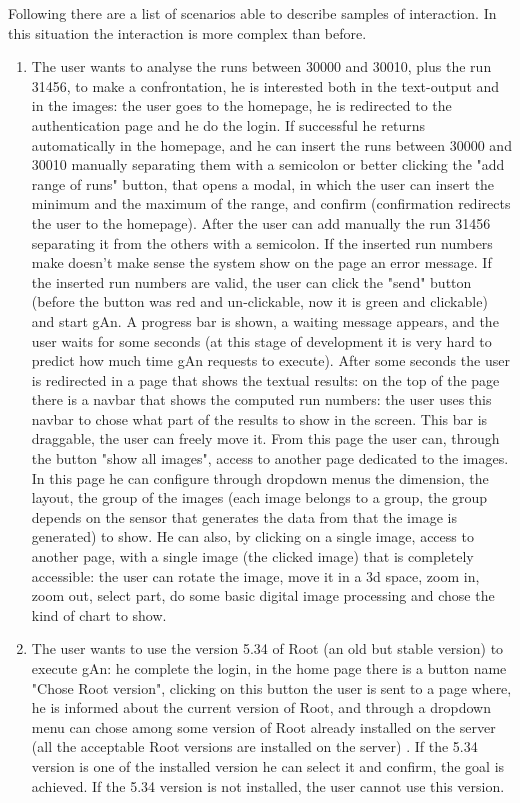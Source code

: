 Following there are a list of scenarios able to describe samples of interaction. In this situation the interaction is more complex than before.

\begin{enumerate}

\item The user wants to analyse the runs between 30000 and 30010, plus the run 31456, to make a confrontation, he is interested both in the text-output and in the images: 
the user goes to the homepage, he is redirected to the authentication page and he do the login. If successful he returns automatically in the homepage, and he can insert the runs between 30000 and 30010 manually separating them with a semicolon or better clicking the "add range of runs" button, that opens a modal, in which the user can insert the minimum and the maximum of the range, and confirm (confirmation redirects the user to the homepage). After the user can add manually the run 31456 separating it from the others with a semicolon. If the inserted run numbers make doesn't make sense the system show on the page an error message. If the inserted run numbers are valid, the user can click the "send" button (before the button was red and un-clickable, now it is green and clickable) and start gAn. A progress bar is shown, a waiting message appears, and the user waits for some seconds (at this stage of development it is very hard to predict how much time gAn requests to execute). After some seconds the user is redirected in a page that shows the textual results: on the top of the page there is a navbar that shows the computed run numbers: the user uses this navbar to chose what part of the results to show in the screen. This bar is draggable, the user can freely move it. From this page the user can, through the button "show all images", access to another page dedicated to the images. In this page he can configure through dropdown menus the dimension, the layout, the group of the images (each image belongs to a group, the group depends on the sensor that generates the data from that the image is generated) to show. He can also, by clicking on a single image, access to another page, with a single image (the clicked image) that is completely accessible: the user can rotate the image, move it in a 3d space, zoom in, zoom out, select part, do some basic digital image processing and chose the kind of chart to show.   

\item The user wants to use the version 5.34 of Root (an old but stable version) to execute gAn: 
he complete the login, in the home page there is a button name "Chose Root version", clicking on this button the user is sent to a page where, he is informed about the current version of Root, and through a dropdown menu can chose among some version of Root already installed on the server (all the acceptable Root versions are installed on the server) . If the 5.34 version is one of the installed version he can select it and confirm, the goal is achieved. If the 5.34 version is not installed, the user cannot use this version.  


\end{enumerate}
